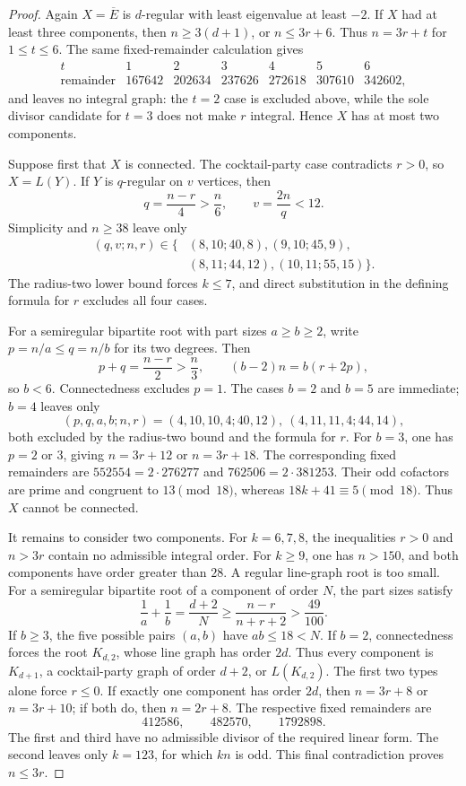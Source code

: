 \documentclass[a4paper,10pt,reqno]{amsart}
\theoremstyle{plain}
\theoremstyle{definition}
\theoremstyle{remark}
\begin{document}
\begin{proof}
 Again \(X=\overline E\) is \(d\)-regular with least eigenvalue at least
 \(-2\).  If \(X\) had at least three components, then
 \(n\ge3(d+1)\), or \(n\le3r+6\).  Thus \(n=3r+t\) for
 \(1\le t\le6\).  The same fixed-remainder calculation gives
 \[
 \begin{array}{c|rrrrrr}
  t&1&2&3&4&5&6\\ \hline
  \text{remainder}
   &167642&202634&237626&272618&307610&342602,
 \end{array}
 \]
 and leaves no integral graph: the \(t=2\) case is excluded above, while the
 sole divisor candidate for \(t=3\) does not make \(r\) integral.  Hence \(X\)
 has at most two components.

 Suppose first that \(X\) is connected.  The cocktail-party case contradicts
 \(r>0\), so \(X=L(Y)\).  If \(Y\) is \(q\)-regular on \(v\) vertices, then
 \[
  q=\frac{n-r}{4}>\frac n6,\qquad v=\frac{2n}{q}<12.
 \]
 Simplicity and \(n\ge38\) leave only
 \[
 \begin{aligned}
  (q,v;n,r)\in\{&(8,10;40,8),(9,10;45,9),\\
                 &(8,11;44,12),(10,11;55,15)\}.
 \end{aligned}
 \]
 The radius-two lower bound forces \(k\le7\), and direct substitution in the
 defining formula for \(r\) excludes all four cases.

 For a semiregular bipartite root with part sizes \(a\ge b\ge2\),
 write \(p=n/a\le q=n/b\) for its two degrees.  Then
 \[
  p+q=\frac{n-r}{2}>\frac n3,
  \qquad (b-2)n=b(r+2p),
 \]
 so \(b<6\).  Connectedness excludes \(p=1\).  The cases \(b=2\) and
 \(b=5\) are immediate; \(b=4\) leaves only
 \[
  (p,q,a,b;n,r)=(4,10,10,4;40,12),\ (4,11,11,4;44,14),
 \]
 both excluded by the radius-two bound and the formula for \(r\).
 For \(b=3\), one has \(p=2\) or \(3\), giving \(n=3r+12\) or
 \(n=3r+18\).  The corresponding fixed remainders are
 \(552554=2\cdot276277\) and \(762506=2\cdot381253\).  Their odd cofactors
 are prime and congruent to \(13\pmod {18}\), whereas \(18k+41\equiv5
 \pmod {18}\).  Thus \(X\) cannot be connected.

 It remains to consider two components.  For \(k=6,7,8\), the inequalities
 \(r>0\) and \(n>3r\) contain no admissible integral order.  For \(k\ge9\),
 one has \(n>150\), and both components have order greater than \(28\).
 A regular line-graph root is too small.  For a semiregular bipartite root
 of a component of order \(N\), the part sizes satisfy
 \[
  \frac1a+\frac1b=\frac{d+2}{N}
  \ge\frac{n-r}{n+r+2}>\frac{49}{100}.
 \]
 If \(b\ge3\), the five possible pairs \((a,b)\) have \(ab\le18<N\).
 If \(b=2\), connectedness forces the root \(K_{d,2}\), whose line graph has
 order \(2d\).  Thus every component is \(K_{d+1}\), a cocktail-party graph
 of order \(d+2\), or \(L(K_{d,2})\).  The first two types alone force
 \(r\le0\).  If exactly one component has order \(2d\), then
 \(n=3r+8\) or \(n=3r+10\); if both do, then \(n=2r+8\).
 The respective fixed remainders are
 \[
  412586,\qquad482570,\qquad1792898.
 \]
 The first and third have no admissible divisor of the required linear form.
 The second leaves only \(k=123\), for which \(kn\) is odd.  This final
 contradiction proves \(n\le3r\).


\end{proof}
\end{document}
